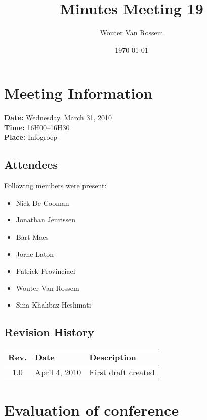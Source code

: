 \documentclass[a4paper, 12pt]{article}
\begin{document}
\title{Minutes Meeting 19}
\author{Wouter Van Rossem}
\date{\today}

\maketitle	
	\section{Meeting Information}
		\textbf{Date:} Wednesday, March 31, 2010\\
		\textbf{Time:} 16H00--16H30\\
		\textbf{Place:} Infogroep\\
		\subsection{Attendees}
Following members were present:
			\begin{itemize}
				\item Nick De Cooman
				\item Jonathan Jeurissen
				\item Bart Maes
				\item Jorne Laton
				\item Patrick Provinciael
				\item Wouter Van Rossem
				\item Sina Khakbaz Heshmati
			\end{itemize}

			 
			
		\subsection{Revision History}
			\begin{tabular}{c | l | l }
				\textbf{Rev.} & \textbf{Date} & \textbf{Description} \\
				\hline
				1.0 & April 4, 2010 & First draft created \\
			\end{tabular}		

	\section{Evaluation of conference}
\end{document}
